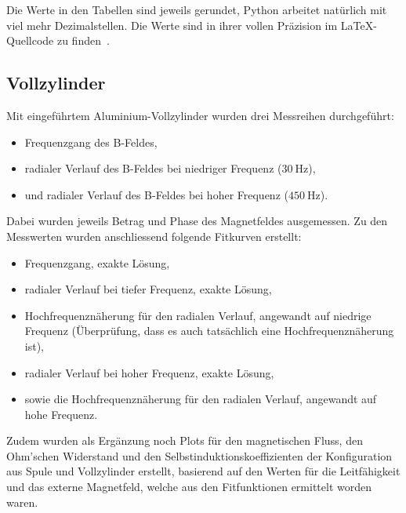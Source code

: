 Die Werte in  den Tabellen sind jeweils gerundet,  Python arbeitet nat\"urlich
mit viel  mehr Dezimalstellen. Die Werte  sind in ihrer vollen  Pr\"azision im
\LaTeX-Quellcode zu finden~\cite{ref:aw:github}.


\subsection{Vollzylinder}
\label{sec:ausw:subsec:hohlz}

Mit   eingef\"uhrtem   Aluminium-Vollzylinder   wurden   drei   Messreihen
durchgef\"uhrt:
\begin{itemize}
    \item
        Frequenzgang des B-Feldes,
    \item
        radialer    Verlauf    des    B-Feldes    bei    niedriger    Frequenz
        ($\SI{30}{\hertz}$),
    \item
        und    radialer   Verlauf    des   B-Feldes    bei   hoher    Frequenz
        ($\SI{450}{\hertz}$).
\end{itemize}

Dabei wurden  jeweils Betrag  und Phase  des Magnetfeldes  ausgemessen. Zu den
Messwerten wurden anschliessend folgende Fitkurven erstellt:
\begin{itemize}
    \item
        Frequenzgang, exakte L\"osung,
    \item
        radialer Verlauf bei tiefer Frequenz, exakte L\"osung,
    \item
        Hochfrequenzn\"aherung  f\"ur  den  radialen  Verlauf,  angewandt  auf
        niedrige Frequenz  (\"Uberpr\"ufung, dass  es auch  tats\"achlich eine
        Hochfrequenzn\"aherung ist),
    \item
        radialer Verlauf bei hoher Frequenz, exakte L\"osung,
    \item
        sowie die Hochfrequenzn\"aherung f\"ur den radialen Verlauf, angewandt
        auf hohe Frequenz.
\end{itemize}

Zudem  wurden als  Erg\"anzung noch  Plots f\"ur  den magnetischen  Fluss, den
Ohm'schen Widerstand  und den Selbstinduktionskoeffizienten  der Konfiguration
aus  Spule und  Vollzylinder  erstellt,  basierend auf  den  Werten f\"ur  die
Leitf\"ahigkeit  und  das externe  Magnetfeld,  welche  aus den  Fitfunktionen
ermittelt worden waren.

